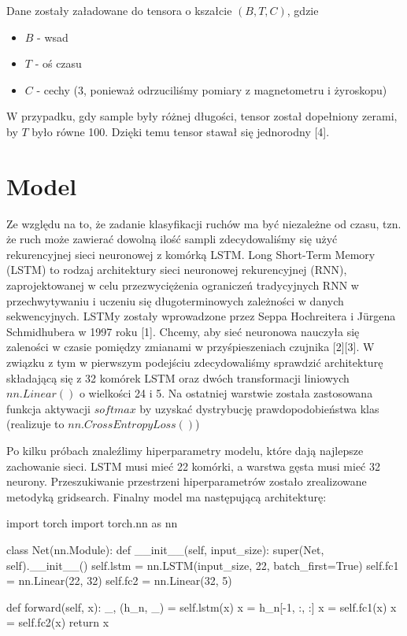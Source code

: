 \documentclass[10pt]{article}
\begin{document}
Dane zostały załadowane do tensora o kszałcie $(B, T, C)$, gdzie
\begin{itemize}
\item $B$ - wsad
\item $T$ - oś czasu
\item $C$ - cechy (3, ponieważ odrzuciliśmy pomiary z magnetometru i żyroskopu)
\end{itemize}  

W przypadku, gdy sample były różnej długości, tensor został dopełniony zerami, by $T$ było równe 100. Dzięki temu tensor stawał się jednorodny [4]. 

\section{Model}

Ze względu na to, że zadanie klasyfikacji ruchów ma być niezależne od czasu, tzn. że ruch może zawierać dowolną ilość sampli zdecydowaliśmy się użyć rekurencyjnej sieci neuronowej z komórką LSTM.
Long Short-Term Memory (LSTM) to rodzaj architektury sieci neuronowej rekurencyjnej (RNN), zaprojektowanej w celu przezwyciężenia ograniczeń tradycyjnych RNN w przechwytywaniu i uczeniu się długoterminowych zależności w danych sekwencyjnych. LSTMy zostały wprowadzone przez Seppa Hochreitera i Jürgena Schmidhubera w 1997 roku [1]. Chcemy, aby sieć neuronowa nauczyła się zaleności w czasie pomiędzy zmianami w przyśpieszeniach czujnika [2][3]. W związku z tym w pierwszym podejściu zdecydowaliśmy sprawdzić architekturę składającą się z 32 komórek LSTM oraz dwóch transformacji liniowych $nn.Linear()$ o wielkości 24 i 5. Na ostatniej warstwie została zastosowana funkcja aktywacji $softmax$ by uzyskać dystrybucję prawdopodobieństwa klas (realizuje to $nn.CrossEntropyLoss()$)


Po kilku próbach znaleźlimy hiperparametry modelu, które dają najlepsze zachowanie sieci. LSTM musi mieć 22 komórki, a warstwa gęsta musi mieć 32 neurony. Przeszukiwanie przestrzeni hiperparametrów zostało zrealizowane metodyką gridsearch. Finalny model ma następującą architekturę:

\begin{python}
import torch
import torch.nn as nn

class Net(nn.Module):
  def __init__(self, input_size):
      super(Net, self).__init__()
      self.lstm = nn.LSTM(input_size, 22, batch_first=True)
      self.fc1 = nn.Linear(22, 32)
      self.fc2 = nn.Linear(32, 5)

  def forward(self, x):
      _, (h_n, _) = self.lstm(x)
      x = h_n[-1, :, :]
      x = self.fc1(x)
      x = self.fc2(x)
      return x
\end{python}
\end{document}
